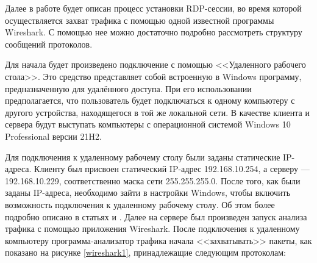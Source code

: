 \documentclass[bachelor, och, coursework]{SCWorks}
\begin{document}
  
  Далее в работе будет описан процесс установки RDP-сессии, во время которой осуществляется захват трафика с помощью одной известной программы Wireshark. С помощью нее
  можно достаточно подробно рассмотреть структуру сообщений протоколов.

  Для начала будет произведено подключение с помощью <<Удаленного рабочего стола>>. Это средство представляет собой встроенную в Windows программу, предназначенную
  для удалённого доступа. При его использовании предполагается, что пользователь будет подключаться к одному компьютеру с другого устройства, находящегося в той же
  локальной сети. В качестве клиента и сервера будут выступать компьютеры с операционной системой Windows 10 Professional версии 21H2. 
  
  
  Для подключения к удаленному рабочему столу были заданы статические IP-адреса. Клиенту был присвоен статический IP-адрес 192.168.10.254,
  а серверу --- 192.168.10.229, соответственно маска сети 255.255.255.0. После того, как были заданы IP-адреса, необходимо зайти в настройки
  Windows, чтобы включить возможность подключения к удаленному рабочему столу. Об этом более подробно описано
  в статьях \cite{userdp1} и \cite{userdp2}. Далее на сервере был произведен запуск анализа трафика с помощью приложения Wireshark.
  После подключения к удаленному компьютеру программа-анализатор трафика начала <<захватывать>> пакеты, как показано на рисунке \ref{wireshark1},
  принадлежащие следующим протоколам:
  
\end{document}
